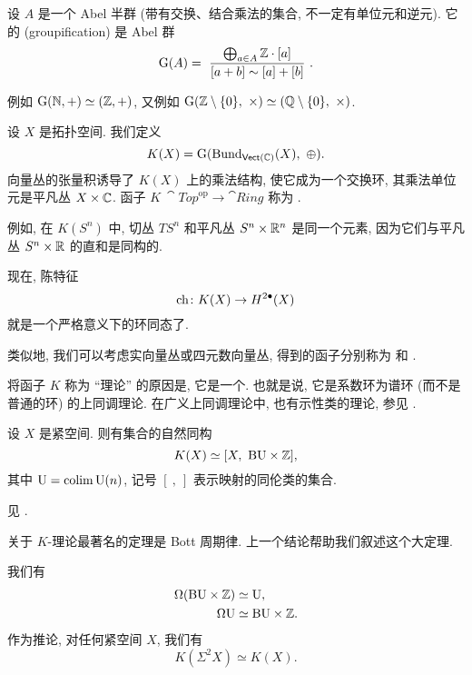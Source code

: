 \begin{definition}
    设 $A$ 是一个 Abel 半群 (带有交换、结合乘法的集合, 不一定有单位元和逆元).
    它的 (groupification) 是 Abel 群
    \[ \operatorname{G}(A) = \ 
        \frac{\bigoplus_{a \in A} \bbZ \cdot [a]}
        {[a + b] \sim [a] + [b]} \ . \]
\end{definition}

例如 $\operatorname{G}(\mathbb{N}, +) \simeq (\mathbb{Z}, +)$, 又例如
$\operatorname{G}(\mathbb{Z} \setminus \{0\},\ \times) \simeq (\mathbb{Q} \setminus \{0\},\ \times)$.

\begin{definition}
    设 $X$ 是拓扑空间. 我们定义
    \[ K(X) = \operatorname{G} (\operatorname{Bund}_{\cat{Vect}(\bbC)}(X),\ \oplus). \]
    向量丛的张量积诱导了 $K(X)$ 上的乘法结构,
    使它成为一个交换环, 其乘法单位元是平凡丛 $X \times \mathbb{C}$.
    函子 $K \: \cat{Top}^{\mathrm{op}} \to \cat{Ring}$
    称为 .
\end{definition}

例如, 在 $K(S^n)$ 中, 切丛 $TS^n$ 和平凡丛 $S^n \times \mathbb{R}^n$ 是同一个元素,
因为它们与平凡丛 $S^n \times \mathbb{R}$ 的直和是同构的.

现在, 陈特征
\[ \operatorname{ch} \colon K(X) \to H^{2\bullet}(X) \]
就是一个严格意义下的环同态了.

\begin{remark}
    类似地, 我们可以考虑实向量丛或四元数向量丛,
    得到的函子分别称为 和 . \varqed
\end{remark}

\begin{remark}
    将函子 $K$ 称为 ``理论'' 的原因是,
    它是一个.
    也就是说, 它是系数环为谱环 (而不是普通的环) 的上同调理论.
    在广义上同调理论中, 也有示性类的理论,
    参见 \cite[16.27~之后]{switzer}. \varqed
\end{remark}

\begin{theorem} \label{thm-3-bu-times-z}
    设 $X$ 是紧空间. 则有集合的自然同构
    \[ K(X) \simeq [X,\ \mathrm{B} \mathrm{U} \times \mathbb{Z}], \]
    其中 $\upU = \colim \upU (n)$,
    记号 $[\ ,\ ]$ 表示映射的同伦类的集合.
\end{theorem}

见 \cite[定理~II.1.33]{karoubi}.

关于 $K$-理论最著名的定理是 Bott 周期律.
上一个结论帮助我们叙述这个大定理.

\begin{theorem}
    我们有
    \[ \begin{aligned}
        \Omega (\mathrm{B} \mathrm{U} \times \mathbb{Z}) & \simeq \mathrm{U}, \\
        \Omega \mathrm{U} & \simeq \mathrm{B} \mathrm{U} \times \mathbb{Z}.
    \end{aligned} \]
    作为推论, 对任何紧空间 $X$, 我们有
    \[ K(\Sigma^2 X) \simeq K(X). \]
\end{theorem}

